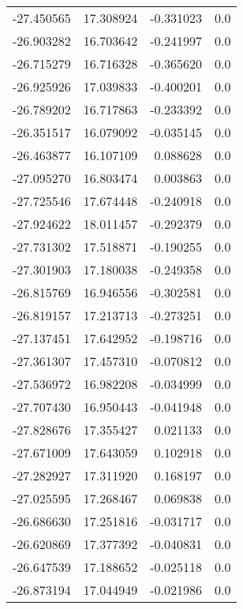 \begin{tabular}{rrrr}
      -27.450565 &        17.308924 &   -0.331023 &   0.0 \\
      -26.903282 &        16.703642 &   -0.241997 &   0.0 \\
      -26.715279 &        16.716328 &   -0.365620 &   0.0 \\
      -26.925926 &        17.039833 &   -0.400201 &   0.0 \\
      -26.789202 &        16.717863 &   -0.233392 &   0.0 \\
      -26.351517 &        16.079092 &   -0.035145 &   0.0 \\
      -26.463877 &        16.107109 &    0.088628 &   0.0 \\
      -27.095270 &        16.803474 &    0.003863 &   0.0 \\
      -27.725546 &        17.674448 &   -0.240918 &   0.0 \\
      -27.924622 &        18.011457 &   -0.292379 &   0.0 \\
      -27.731302 &        17.518871 &   -0.190255 &   0.0 \\
      -27.301903 &        17.180038 &   -0.249358 &   0.0 \\
      -26.815769 &        16.946556 &   -0.302581 &   0.0 \\
      -26.819157 &        17.213713 &   -0.273251 &   0.0 \\
      -27.137451 &        17.642952 &   -0.198716 &   0.0 \\
      -27.361307 &        17.457310 &   -0.070812 &   0.0 \\
      -27.536972 &        16.982208 &   -0.034999 &   0.0 \\
      -27.707430 &        16.950443 &   -0.041948 &   0.0 \\
      -27.828676 &        17.355427 &    0.021133 &   0.0 \\
      -27.671009 &        17.643059 &    0.102918 &   0.0 \\
      -27.282927 &        17.311920 &    0.168197 &   0.0 \\
      -27.025595 &        17.268467 &    0.069838 &   0.0 \\
      -26.686630 &        17.251816 &   -0.031717 &   0.0 \\
      -26.620869 &        17.377392 &   -0.040831 &   0.0 \\
      -26.647539 &        17.188652 &   -0.025118 &   0.0 \\
      -26.873194 &        17.044949 &   -0.021986 &   0.0 \\

\end{tabular}
